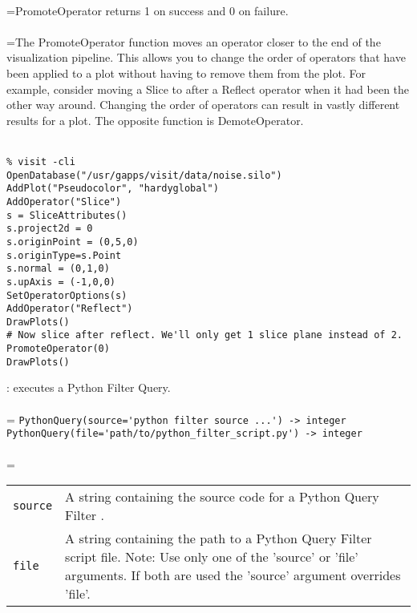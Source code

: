 \documentclass[10pt,a4paper]{report}
\begin{document}
 \\ 
\hangindent=\parindent PromoteOperator returns 1 on success and 0 on failure. \\[-3mm] 

 \\ 
\hangindent=\parindent The PromoteOperator function moves an operator closer to the end of the visualization pipeline. This allows you to change the order of operators that have been applied to a plot without having to remove them from the plot. For example, consider moving a Slice to after a Reflect operator when it had been the other way around. Changing the order of operators can result in vastly different results for a plot. The opposite function is DemoteOperator. \\[-3mm] 

\\[-6mm]
\begin{verbatim}% visit -cli
OpenDatabase("/usr/gapps/visit/data/noise.silo")
AddPlot("Pseudocolor", "hardyglobal")
AddOperator("Slice")
s = SliceAttributes()
s.project2d = 0
s.originPoint = (0,5,0)
s.originType=s.Point
s.normal = (0,1,0)
s.upAxis = (-1,0,0)
SetOperatorOptions(s)
AddOperator("Reflect")
DrawPlots()
# Now slice after reflect. We'll only get 1 slice plane instead of 2.
PromoteOperator(0)
DrawPlots()
\end{verbatim}
\newpage


{}
: executes a Python Filter Query.\\[-3mm]

 \\ 
\hangindent=\parindent 
\verb!PythonQuery(source='python filter source ...') -> integer!\\ 
\verb!PythonQuery(file='path/to/python_filter_script.py') -> integer!\\ [-3mm]

 \\ 
\hangindent=\parindent 
\begin{tabular}{lp{9cm}}
\verb!source! & A string containing the source code for a Python Query Filter . \\
\verb!file! & A string containing the path to a Python Query Filter script file. Note: Use only one of the 'source' or 'file' arguments. If both are used the 'source' argument overrides 'file'. \\
\end{tabular} \\[-2mm]
\end{document}
